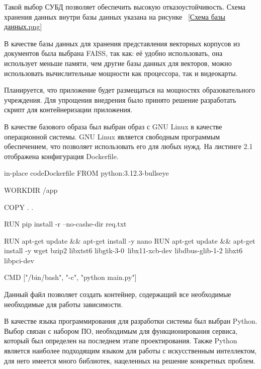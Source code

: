 Такой выбор СУБД позволяет обеспечить высокую отказоустойчивость. Схема 
хранения данных внутри базы данных указана на рисунке
~\ref{Схема базы данных.png}

В качестве базы данных для хранения представления векторных корпусов из 
документов была выбрана FAISS, так как: её удобно использовать, она использует
меньше памяти, чем другие базы данных для векторов, можно использовать 
вычислительные мощности как процессора, так и видеокарты.


Планируется, что приложение будет размещаться на мощностях образовательного
учреждения. Для упрощения внедрения было принято решение разработать скрипт
для контейнеризации приложения.

В качестве базового образа был выбран образ с GNU Linux в качестве
операционной системы.
GNU Linux является свободным программым обеспечением, что позволяет
использовать его для любых нужд. На листинге 2.1 отображена конфигурация
Dockerfile.

\begin{codepiece}{in-place code}{Dockerfile}
    FROM python:3.12.3-bullseye
    
    WORKDIR /app
    
    COPY . .
    
    RUN pip install -r --no-cashe-dir req.txt
    
    RUN apt-get update && apt-get install -y nano
    RUN apt-get update && apt-get install -y wget bzip2 libxtst6 libgtk-3-0\
     libx11-xcb-dev libdbus-glib-1-2 libxt6 libpci-dev
    
    CMD ["/bin/bash", "-c", "python main.py"]
\end{codepiece}

Данный файл позволяет создать контейнер, содержащий все необходимые 
необходимые для работы зависимости.


В качестве языка программирования для разработки системы был выбран Python. 
Выбор связан с набором ПО, необходимым для функционирования сервиса, который
был определен на последнем этапе проектирования. Также Python является
наиболее подходящим языком для работы с искусственным интеллектом, для
него имеется много библиотек, нацеленных на решение конкретных проблем.

